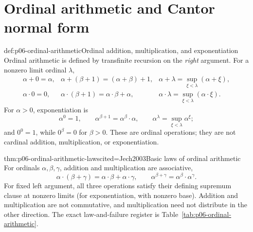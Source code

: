 
\section{Ordinal arithmetic and Cantor normal form}
\label{sec:p06-ordinal-arithmetic}

\begin{hbdefinition}{def:p06-ordinal-arithmetic}{Ordinal addition, multiplication, and exponentiation}
Ordinal arithmetic is defined by transfinite recursion on the \emph{right}
argument.  For a nonzero limit ordinal \(\lambda\),
\[
\begin{array}{lll}
 \alpha+0=\alpha,
 &\alpha+(\beta+1)=(\alpha+\beta)+1,
 &\alpha+\lambda=\sup_{\xi<\lambda}(\alpha+\xi),\\[2pt]
 \alpha\cdot0=0,
 &\alpha\cdot(\beta+1)=\alpha\cdot\beta+\alpha,
 &\alpha\cdot\lambda=\sup_{\xi<\lambda}(\alpha\cdot\xi).
\end{array}
\]
For \(\alpha>0\), exponentiation is
\[
 \alpha^0=1,
 \qquad
 \alpha^{\beta+1}=\alpha^\beta\cdot\alpha,
 \qquad
 \alpha^\lambda=\sup_{\xi<\lambda}\alpha^\xi;
\]
and \(0^0=1\), while \(0^\beta=0\) for \(\beta>0\).  These are ordinal
operations; they are not cardinal addition, multiplication, or exponentiation.
\end{hbdefinition}

\begin{hbtheorem}{thm:p06-ordinal-arithmetic-laws}{cited=Jech2003}{Basic laws of ordinal arithmetic}
For ordinals \(\alpha,\beta,\gamma\), addition and multiplication are
associative,
\[
 \alpha\cdot(\beta+\gamma)=
 \alpha\cdot\beta+\alpha\cdot\gamma,
 \qquad
 \alpha^{\beta+\gamma}=\alpha^\beta\cdot\alpha^\gamma.
\]
For fixed left argument, all three operations satisfy their defining supremum
clause at nonzero limits (for exponentiation, with nonzero base).  Addition and
multiplication are not commutative, and multiplication need not distribute in
the other direction.  The exact law-and-failure register is
Table~\ref{tab:p06-ordinal-arithmetic}.
\end{hbtheorem}


